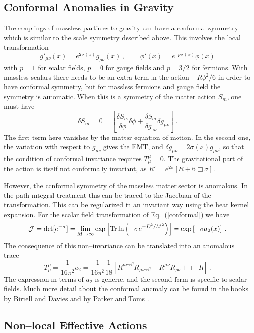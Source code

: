 \documentclass[12pt]{article}
\newcommand{\be}{\begin{equation}}
\newcommand{\ee}{\end{equation}}
\newcommand{\Tr}{{\rm Tr}}
\begin{document}
\subsection{Conformal Anomalies in Gravity}

The couplings of massless particles to gravity can have a conformal symmetry which is similar to the scale symmetry described above. This involves the local transformation
\be
g'_{\mu\nu} (x) = e^{2\sigma (x)}g_{\mu\nu} (x) \,,       ~~~~~~~~~~\phi' (x) = e^{-p\sigma(x)} \phi (x)
\label{conformal}
\ee
with $p=1$ for scalar fields, $p=0$ for gauge fields and $p=3/2$ for fermions. With massless scalars there needs to be an extra term in the action $-R\phi^2/6$ in order to have conformal symmetry, but for massless fermions and gauge field the symmetry is automatic. When this is a symmetry of the matter action $S_m$, one must have
\be
\delta S_m = 0 = \left[\frac{\delta S_m}{\delta \phi}\delta \phi +\frac{\delta S_m}{\delta g_{\mu\nu}}\delta g_{\mu\nu} \right]   \,.
\ee
The first term here vanishes by the matter equation of motion. In the second one, the variation with respect to $g_{\mu\nu}$ gives the EMT, and $\delta g_{\mu\nu} = 2\sigma(x)  g_{\mu\nu}$, so that the condition of conformal invariance requires $T^\mu_\mu =0$. The gravitational part of the action is itself not conformally invariant, as $R'=e^{2\sigma } [R +6\Box \sigma]$.

However, the conformal symmetry of the massless matter sector is anomalous. In the path integral treatment this can be traced to the Jacobian of the transformation. This can be regularized in an invariant way using the heat kernel expansion. For the scalar field transformation of Eq.~(\ref{conformal}) we have
\be
{\cal J}= \det[e^{-\sigma}] = \lim_{M\to \infty} \exp\left[\Tr \,\text{ln} \left(-\sigma e^{-D^2/M^2}\right)\right]= \exp \left[-\sigma a_2(x)\right] \,.
\ee
The consequence of this non--invariance can be translated into an anomalous trace
\be
T^\mu_\mu = \frac{1}{16\pi^2}a_2 = \frac{1}{16\pi^2}\frac{1}{18}\left[R^{\mu\nu\alpha\beta}  R_{\mu\nu\alpha\beta}  - R^{\mu\nu}  R_{\mu\nu} +\Box R \right] \,.
\ee
The expression in terms of $a_2$ is generic, and the second form is specific to scalar fields. Much more detail about the conformal anomaly can be found in the books by Birrell and Davies \cite{Birrell:1982ix} and by Parker and Toms \cite{Parker:2009uva}.


\subsection{Non--local Effective Actions}
\end{document}
